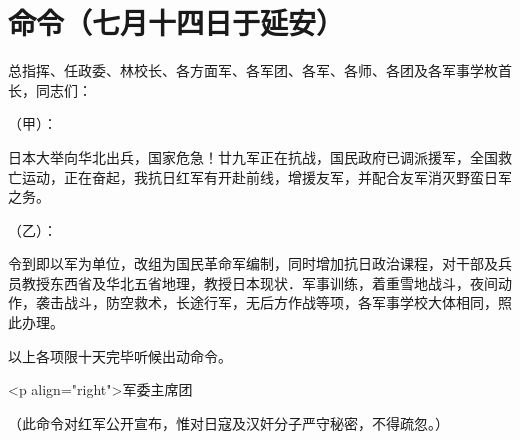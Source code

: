 \section[命令（七月十四日于延安）]{命令（七月十四日于延安）}


总指挥、任政委、林校长、各方面军、各军团、各军、各师、各团及各军事学枚首长，同志们：

（甲）：

日本大举向华北出兵，国家危急！廿九军正在抗战，国民政府已调派援军，全国救亡运动，正在奋起，我抗日红军有开赴前线，增援友军，并配合友军消灭野蛮日军之务。

（乙）：

令到即以军为单位，改组为国民革命军编制，同时增加抗日政治课程，对干部及兵员教授东西省及华北五省地理，教授日本现状．军事训练，着重雪地战斗，夜间动作，袭击战斗，防空救术，长途行军，无后方作战等项，各军事学校大体相同，照此办理。

以上各项限十天完毕听候出动命令。

<p align="right">军委主席团

（此命令对红军公开宣布，惟对日寇及汉奸分子严守秘密，不得疏忽。）

